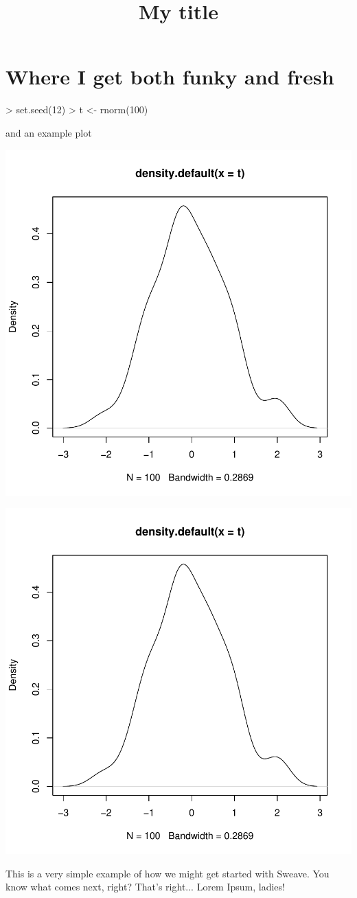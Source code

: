 \documentclass{tufte-book}
\title{My title}
\begin{document}

 \section{Where I get both funky and fresh}
\begin{Schunk}
\begin{Sinput}
>   set.seed(12)
>   t <- rnorm(100)
\end{Sinput}
\end{Schunk}
and an example plot
\begin{center}
\includegraphics{SweaveExample-002}
\end{center}

\begin{marginfigure}
\includegraphics{SweaveExample-004}
\end{marginfigure}

This is a very simple example of how we might get started with Sweave. You know what comes next, right? That's right... Lorem Ipsum, ladies! 
\lipsum
\end{document}
